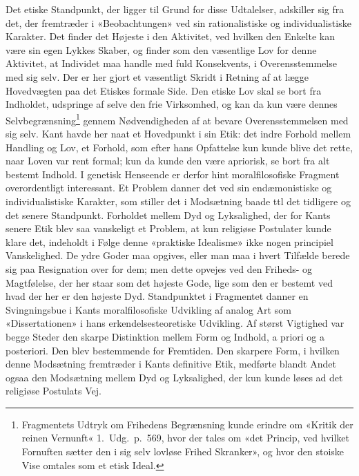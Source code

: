 \documentclass[12pt,a4paper]{article}
\newcommand{\apage}[1]{\marginnote{\footnotesize\textit{[#1]}}}
\begin{document}
Det etiske Standpunkt, der ligger til Grund for disse Udtalelser,
adskiller sig fra det, der fremtræder i «Beobachtungen» ved sin
rationalistiske og individualistiske Karakter. Det finder det Højeste i
den Aktivitet, ved hvilken den Enkelte kan være sin egen Lykkes Skaber,
og finder som den væsentlige Lov for denne Aktivitet, at Individet maa
handle med fuld Konsekvents, i Overensstemmelse med sig selv. Der er her
gjort et væsentligt Skridt i Retning af at lægge Hovedvægten paa det
Etiskes formale Side. Den etiske Lov skal se bort fra Indholdet, udspringe
af selve den frie Virksomhed, og kan da kun være dennes
Selvbegrænsning\footnote{Fragmentets Udtryk om Frihedens Begrænsning
kunde erindre om «Kritik der reinen Vernunft« 1.\ Udg.\ p.\ 569, hvor der
tales om «det Princip, ved hvilket Fornuften sætter den i sig selv
lovløse Frihed Skranker», og hvor den stoiske Vise omtales som et etisk
Ideal.} gennem Nødvendigheden af at bevare Overensstemmelsen med sig
selv. Kant havde her naat et Hovedpunkt i sin Etik: det indre Forhold
mellem Handling og Lov, et Forhold, som efter hans Opfattelse kun kunde
blive det rette, naar Loven var rent formal; kun da kunde den være
apriorisk, se bort fra alt bestemt Indhold. I genetisk Henseende er
derfor hint moralfilosofiske Fragment overordentligt interessant. Et
Problem danner det ved sin endæmonistiske og individualistiske Karakter,
som stiller det i Modsætning baade ttl det tidligere og det senere
Standpunkt. Forholdet mellem Dyd og Lyksalighed, der for Kants senere
Etik blev saa vanskeligt et Problem, at kun religiøse Postulater kunde
klare det, indeholdt i Følge denne «praktiske Idealisme» ikke nogen
principiel Vanskelighed. De ydre Goder maa opgives, eller man maa i hvert
Tilfælde berede sig paa Resignation over for dem; men dette opvejes ved
den Friheds- og Magtfølelse, der her staar som det højeste Gode, lige som
den er bestemt ved hvad der her er den højeste Dyd. Standpunktet i
Fragmentet danner en Svingningsbue i Kants moralfilosofiske Udvikling af
analog Art som «Dissertationen» i hans erkendelsesteoretiske Udvikling.
Af størst Vigtighed var begge Steder den skarpe Distinktion mellem Form
og Indhold, a priori og a posteriori. Den blev bestemmende for Fremtiden.
Den skarpere \apage{44}  Form, i hvilken denne Modsætning fremtræder i Kants
definitive Etik, medførte blandt Andet ogsaa den Modsætning mellem Dyd og
Lyksalighed, der kun kunde løses ad det religiøse Postulats Vej.
\end{document}
